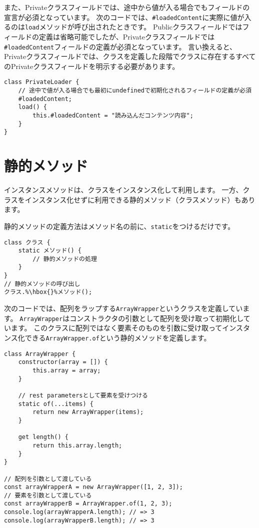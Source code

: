 また、Privateクラスフィールドでは、途中から値が入る場合でもフィールドの宣言が必須となっています。
次のコードでは、\texttt{\#loadedContent}に実際に値が入るのは\texttt{load}メソッドが呼び出されたときです。
Publicクラスフィールドではフィールドの定義は省略可能でしたが、Privateクラスフィールドでは\texttt{\#loadedContent}フィールドの定義が必須となっています。
言い換えると、Privateクラスフィールドでは、クラスを定義した段階でクラスに存在するすべてのPrivateクラスフィールドを明示する必要があります。

\begin{lstlisting}
class PrivateLoader {
    // 途中で値が入る場合でも最初にundefinedで初期化されるフィールドの定義が必須
    #loadedContent;
    load() {
        this.#loadedContent = "読み込んだコンテンツ内容";
    }
}
\end{lstlisting}

\hypertarget{static-method}{%
\section{静的メソッド}\label{static-method}}

インスタンスメソッドは、クラスをインスタンス化して利用します。
一方、クラスをインスタンス化せずに利用できる静的メソッド（クラスメソッド）もあります。

静的メソッドの定義方法はメソッド名の前に、\texttt{static}をつけるだけです。

\begin{lstlisting}[escapechar=\%]
class クラス {
    static メソッド() {
        // 静的メソッドの処理
    }
}
// 静的メソッドの呼び出し
クラス.%\hbox{}%メソッド();
\end{lstlisting}

次のコードでは、配列をラップする\texttt{ArrayWrapper}というクラスを定義しています。\enlargethispage{\baselineskip}
\texttt{ArrayWrapper}はコンストラクタの引数として配列を受け取って初期化しています。
このクラスに配列ではなく要素そのものを引数に受け取ってインスタンス化できる\texttt{ArrayWrapper.of}という静的メソッドを定義します。

\begin{lstlisting}
class ArrayWrapper {
    constructor(array = []) {
        this.array = array;
    }

    // rest parametersとして要素を受けつける
    static of(...items) {
        return new ArrayWrapper(items);
    }

    get length() {
        return this.array.length;
    }
}

// 配列を引数として渡している
const arrayWrapperA = new ArrayWrapper([1, 2, 3]);
// 要素を引数として渡している
const arrayWrapperB = ArrayWrapper.of(1, 2, 3);
console.log(arrayWrapperA.length); // => 3
console.log(arrayWrapperB.length); // => 3
\end{lstlisting}

